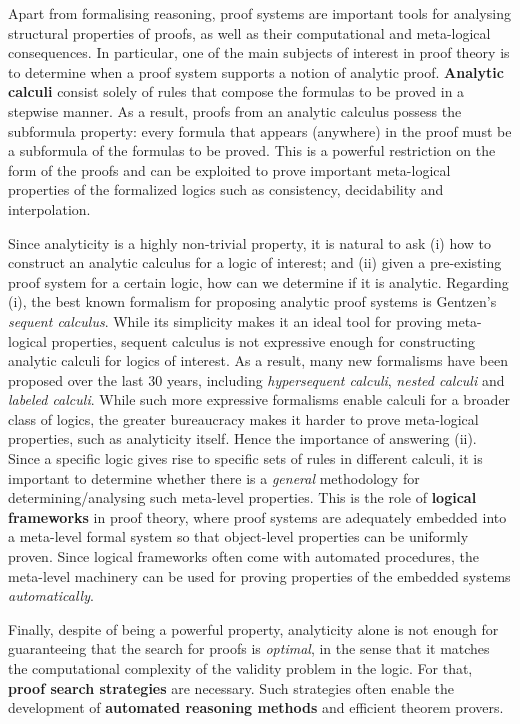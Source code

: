\documentclass[11pt,a4paper]{article}
\begin{document}
Apart from formalising reasoning, proof systems are important tools for analysing structural properties of proofs, as well as 
their computational and meta-logical consequences.
In particular, one of the main subjects of interest in proof theory is to determine when
a proof system supports a notion of analytic proof. {\bf Analytic calculi} consist solely of rules that compose the formulas to be proved in a stepwise manner. As a result, proofs from an analytic calculus possess the subformula property: every formula that appears 
(anywhere) 
in the proof must be a subformula of the formulas to be proved. This is a powerful restriction on the form of the proofs and can be exploited to prove important meta-logical properties of the formalized logics such as consistency, decidability and interpolation. 

Since analyticity is a highly non-trivial 
property, it is natural to ask (i) how to construct an analytic calculus for a logic of interest; and (ii) given a pre-existing proof system for a certain logic, how can we determine if it is analytic.
Regarding (i), the best known formalism for proposing analytic proof systems 
is Gentzen's  {\em sequent calculus}.
While its simplicity makes it an ideal tool for proving meta-logical properties, sequent calculus is
not expressive enough for constructing analytic  calculi for logics of interest. As a result, many new formalisms have been proposed over the last 30 years, including  {\em hypersequent calculi}, {\em nested calculi} and  {\em labeled calculi}. While such more expressive formalisms enable calculi for a broader class of logics, the greater bureaucracy makes it harder to prove meta-logical properties, such as analyticity itself. Hence the importance of answering (ii). Since a
specific 
logic gives rise to specific sets of rules in different calculi, it is important to determine  whether there is a {\em general} methodology for determining/analysing such meta-level properties. This is the role of {\bf logical frameworks} in proof theory, where
proof systems are 
adequately embedded
into a meta-level formal system so that object-level properties can be uniformly proven.
Since logical frameworks often come with automated procedures, the meta-level machinery can be used for proving properties  of the embedded systems {\em automatically}.

Finally, despite of being a powerful property, analyticity alone is not enough for guaranteeing that the search for proofs is {\em optimal}, in the sense that it matches the computational complexity of the validity problem in the logic.
For that, {\bf proof search strategies} are necessary. 
Such strategies often enable the development of
{\bf automated reasoning methods} and efficient theorem provers. 
\end{document}

